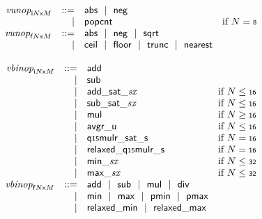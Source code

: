 $$
\begin{array}[t]{@{}lrrl@{}l@{}}
& {{\mathit{vunop}}}_{{{\mathsf{i}}{N}}{\mathsf{x}}{M}} & ::= & \mathsf{abs} ~~|~~ \mathsf{neg} \\
& & | & \mathsf{popcnt} & \quad \mbox{if}~ N = \mathsf{{\scriptstyle 8}} \\
& {{\mathit{vunop}}}_{{{\mathsf{f}}{N}}{\mathsf{x}}{M}} & ::= & \mathsf{abs} ~~|~~ \mathsf{neg} ~~|~~ \mathsf{sqrt} \\
& & | & \mathsf{ceil} ~~|~~ \mathsf{floor} ~~|~~ \mathsf{trunc} ~~|~~ \mathsf{nearest} \\
\end{array}
$$

$$
\begin{array}[t]{@{}lrrl@{}l@{}}
& {{\mathit{vbinop}}}_{{{\mathsf{i}}{N}}{\mathsf{x}}{M}} & ::= & \mathsf{add} \\
& & | & \mathsf{sub} \\
& & | & {\mathsf{add\_sat}}{\mathsf{\_}}{{\mathit{sx}}} & \quad \mbox{if}~ N \leq \mathsf{{\scriptstyle 16}} \\
& & | & {\mathsf{sub\_sat}}{\mathsf{\_}}{{\mathit{sx}}} & \quad \mbox{if}~ N \leq \mathsf{{\scriptstyle 16}} \\
& & | & \mathsf{mul} & \quad \mbox{if}~ N \geq \mathsf{{\scriptstyle 16}} \\
& & | & {\mathsf{avgr}}{\mathsf{\_}}{\mathsf{u}} & \quad \mbox{if}~ N \leq \mathsf{{\scriptstyle 16}} \\
& & | & {\mathsf{q{\scriptstyle 15}mulr\_sat}}{\mathsf{\_}}{\mathsf{s}} & \quad \mbox{if}~ N = \mathsf{{\scriptstyle 16}} \\
& & | & {\mathsf{relaxed\_q{\scriptstyle 15}mulr}}{\mathsf{\_}}{\mathsf{s}} & \quad \mbox{if}~ N = \mathsf{{\scriptstyle 16}} \\
& & | & {\mathsf{min}}{\mathsf{\_}}{{\mathit{sx}}} & \quad \mbox{if}~ N \leq \mathsf{{\scriptstyle 32}} \\
& & | & {\mathsf{max}}{\mathsf{\_}}{{\mathit{sx}}} & \quad \mbox{if}~ N \leq \mathsf{{\scriptstyle 32}} \\
& {{\mathit{vbinop}}}_{{{\mathsf{f}}{N}}{\mathsf{x}}{M}} & ::= & \mathsf{add} ~~|~~ \mathsf{sub} ~~|~~ \mathsf{mul} ~~|~~ \mathsf{div} \\
& & | & \mathsf{min} ~~|~~ \mathsf{max} ~~|~~ \mathsf{pmin} ~~|~~ \mathsf{pmax} \\
& & | & \mathsf{relaxed\_min} ~~|~~ \mathsf{relaxed\_max} \\
\end{array}
$$

